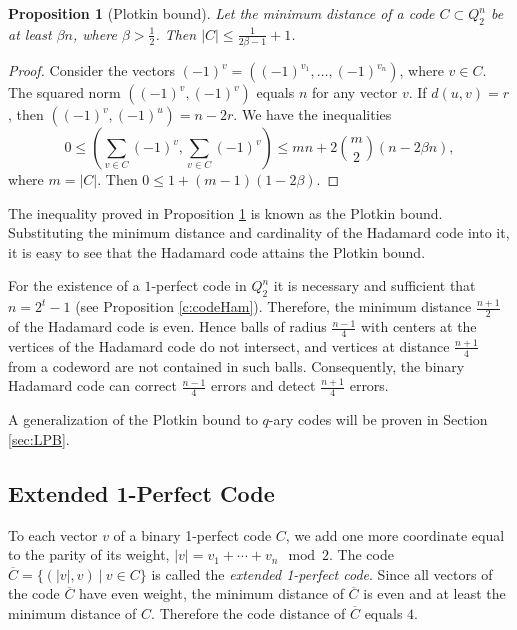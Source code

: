 \documentclass[11pt]{article}
\newtheorem{claim}{Proposition}[section]
\theoremstyle{definition}
\begin{document}
{{{\begin{claim}[Plotkin bound]\label{c:plotkin}
Let the minimum distance of a code $C\subset Q^n_2$ be at least $\beta n$, where $\beta>\frac12$. Then $|C|\leq \frac{1}{2\beta-1}+1$.
\end{claim}
\begin{proof}
Consider the vectors $(-1)^v=((-1)^{v_1},\dots,(-1)^{v_n})$, where $v\in C$. The  squared norm $((-1)^v,(-1)^v)$ equals $n$ for any vector $v$. If $d(u,v)=r$, then $((-1)^v,(-1)^u)=n-2r$. We have the inequalities
$$0\leq(\sum\limits_{v\in C}(-1)^v,\sum\limits_{v\in C}(-1)^v)\leq
mn+2{m \choose 2}(n-2\beta n),$$
where $m=|C|$. Then $0\leq 1+(m-1)(1-2\beta)$.
\end{proof}

The inequality proved in Proposition \ref{c:plotkin} is known as the Plotkin bound. Substituting the minimum distance and cardinality of the Hadamard code into it, it is easy to see that the Hadamard code attains the Plotkin bound.

For the existence of a $1$-perfect code in $Q^n_2$ it is necessary and sufficient that $n=2^t-1$ (see Proposition \ref{c:codeHam}). Therefore, the minimum distance $\frac{n+1}{2}$ of the Hadamard code is even. Hence balls of radius $\frac{n-1}{4}$ with centers at the vertices of the Hadamard code do not intersect, and vertices at distance $\frac{n+1}{4}$ from a codeword are not contained in such balls. Consequently, the binary Hadamard code can correct $\frac{n-1}{4}$ errors and detect $\frac{n+1}{4}$ errors. 

A generalization of the Plotkin bound to $q$-ary codes will be proven in Section \ref{sec:LPB}.

\subsection{Extended 1-Perfect Code }

To each vector $v$ of a binary 1-perfect  code $C$, we add one more coordinate equal  to the parity of its weight, $|v|=v_1+\cdots+v_n\mod 2$. The  code $\overline{C}=\{(|v|,v) \ |\ v\in C\}$ is called the {\sl extended 1-perfect code}. Since all vectors of the code $\overline{C}$ have even weight, the minimum distance of $\overline{C}$ is even and at least the  minimum distance of  $C$. Therefore the code distance of $\overline{C}$ equals $4$.

}}}
\end{document}
